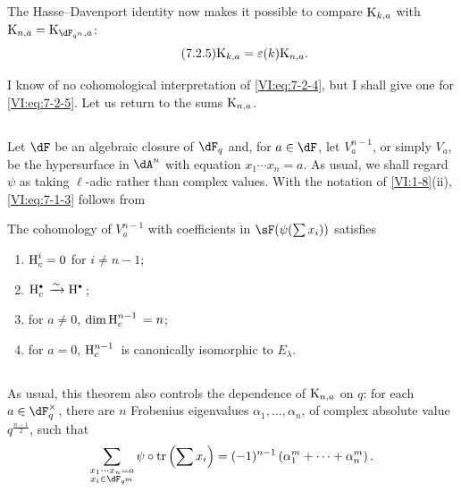 The Hasse--Davenport identity now makes it possible to compare $\textnormal{K}_{k,a}$ 
with $\kloos_{n,a} = \kloos_{\dF_{q^n},a}$: 
\begin{equation*}\tag{7.2.5}\label{VI:eq:7-2-5}
  \textnormal{K}_{k,a} = \varepsilon(k) \textnormal{K}_{n,a} \text{.} 
\end{equation*}

I know of no cohomological interpretation of \eqref{VI:eq:7-2-4}, but 
I shall give one for \eqref{VI:eq:7-2-5}. Let us return to the sums $\textnormal{K}_{n,a}$. 





\subsection{}\label{VI:7-3}

Let $\dF$ be an algebraic closure of $\dF_q$ and, for $a\in \dF$, let 
$V_a^{n-1}$, or simply $V_a$, be the hypersurface in $\dA^n$ with equation 
$x_1 \dotsm x_n=a$. As usual, we shall regard $\psi$ as taking 
$\ell$-adic rather than complex values. With the notation of 
\ref{VI:1-8}(ii), \eqref{VI:eq:7-1-3} follows from 





\begin{theorem_}\label{VI:7-4}
The cohomology of $V_a^{n-1}$ with coefficients in $\sF(\psi(\sum x_i))$ satisfies 
\begin{enumerate}[\indent (i)]
  \item $\operatorname{H}_c^i=0$ for $i\ne n-1$; 
  \item $\h_c^\bullet{} \iso \h^\bullet{}$; 
  \item for $a\ne 0$, $\dim \operatorname{H}_c^{n-1}{}=n$; 
  \item for $a=0$, $\operatorname{H}_c^{n-1}{}$ is canonically isomorphic to $E_\lambda$. 
\end{enumerate}
\end{theorem_}





\subsection{}\label{VI:7-5}

As usual, this theorem also controls the dependence of 
$\textnormal{K}_{n,a}$ on $q$: for each $a\in \dF_q^\times$, there are $n$ Frobenius 
eigenvalues $\alpha_1,\dots,\alpha_n$, of complex absolute value 
$q^{\frac{n-1}{2}}$, such that 
\[
  \sum_{\substack{x_1\dotsm x_n = a \\ x_i\in \dF_{q^m}}} \psi\circ \tr\left(\sum x_i\right) = (-1)^{n-1} \left(\alpha_1^m + \cdots + \alpha_n^m \right) \text{.} 
\]

